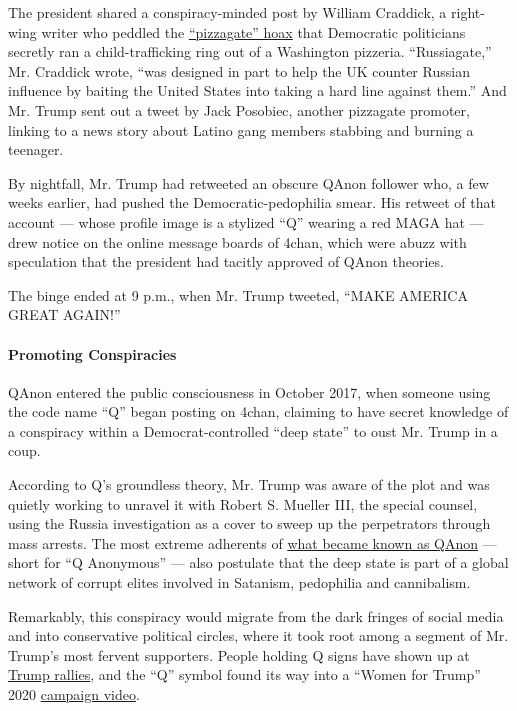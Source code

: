 The president shared a conspiracy-minded post by William Craddick, a
right-wing writer who peddled the
\href{https://www.rollingstone.com/politics/politics-news/anatomy-of-a-fake-news-scandal-125877/}{``pizzagate''
hoax} that Democratic politicians secretly ran a child-trafficking ring
out of a Washington pizzeria. ``Russiagate,'' Mr. Craddick wrote, ``was
designed in part to help the UK counter Russian influence by baiting the
United States into taking a hard line against them.'' And Mr. Trump sent
out a tweet by Jack Posobiec, another pizzagate promoter, linking to a
news story about Latino gang members stabbing and burning a teenager.

By nightfall, Mr. Trump had retweeted an obscure QAnon follower who, a
few weeks earlier, had pushed the Democratic-pedophilia smear. His
retweet of that account --- whose profile image is a stylized ``Q''
wearing a red MAGA hat --- drew notice on the online message boards of
4chan, which were abuzz with speculation that the president had tacitly
approved of QAnon theories.

The binge ended at 9 p.m., when Mr. Trump tweeted, ``MAKE AMERICA GREAT
AGAIN!''

\hypertarget{promoting-conspiracies}{%
\paragraph{Promoting Conspiracies}\label{promoting-conspiracies}}

QAnon entered the public consciousness in October 2017, when someone
using the code name ``Q'' began posting on 4chan, claiming to have
secret knowledge of a conspiracy within a Democrat-controlled ``deep
state'' to oust Mr. Trump in a coup.

According to Q's groundless theory, Mr. Trump was aware of the plot and
was quietly working to unravel it with Robert S. Mueller III, the
special counsel, using the Russia investigation as a cover to sweep up
the perpetrators through mass arrests. The most extreme adherents of
\href{https://www.nbcnews.com/tech/tech-news/how-three-conspiracy-theorists-took-q-sparked-qanon-n900531}{what
became known as QAnon} --- short for ``Q Anonymous'' --- also postulate
that the deep state is part of a global network of corrupt elites
involved in Satanism, pedophilia and cannibalism.

Remarkably, this conspiracy would migrate from the dark fringes of
social media and into conservative political circles, where it took root
among a segment of Mr. Trump's most fervent supporters. People holding Q
signs have shown up at
\href{https://www.nytimes.com/2018/08/01/us/politics/what-is-qanon.html}{Trump
rallies}, and the ``Q'' symbol found its way into a ``Women for Trump''
2020
\href{https://www.thedailybeast.com/trump-campaign-ad-features-qanon-signs}{campaign
video}.

